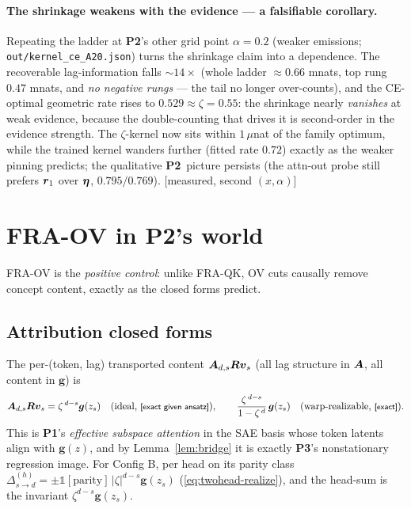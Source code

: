 \documentclass{article}
\newcommand{\gb}{\boldsymbol{g}}
\newcommand{\ind}{\mathbb{1}}
\newcommand{\htag}[1]{{\normalfont\sffamily\footnotesize[#1]}}
\newcommand{\Pone}{\textbf{P1}}
\newcommand{\Ptwo}{\textbf{P2}}
\newcommand{\Pthree}{\textbf{P3}}
\newcommand{\priorA}{\textsf{[prior-A]}}
\newcommand{\priorB}{\textsf{[prior-B]}}
\begin{document}
\paragraph{The shrinkage weakens with the evidence --- a falsifiable corollary.}
Repeating the ladder at \Ptwo's other grid point $\alpha=0.2$ (weaker emissions;
\texttt{out/kernel\_ce\_A20.json}) turns the shrinkage claim into a dependence. The
recoverable lag-information falls ${\sim}14\times$ (whole ladder ${\approx}0.66$ mnats,
top rung $0.47$ mnats, and \emph{no negative rungs} --- the tail no longer over-counts),
and the CE-optimal geometric rate rises to $0.529\approx\zeta=0.55$: the shrinkage nearly
\emph{vanishes} at weak evidence, because the double-counting that drives it is
second-order in the evidence strength. The $\zeta$-kernel now sits within $1\,\mu$nat of
the family optimum, while the trained kernel wanders further (fitted rate $0.72$) exactly
as the weaker pinning predicts; the qualitative \Ptwo\ picture persists (the attn-out
probe still prefers $\boldsymbol{r}_1$ over $\boldsymbol{\eta}$, $0.795/0.769$). \htag{measured, second
$(x,\alpha)$}

\section{FRA-OV in \Ptwo's world}\label{sec:ov}

FRA-OV is the \emph{positive control}: unlike FRA-QK, OV cuts causally remove
concept content, exactly as the closed forms predict.

\subsection{Attribution closed forms}\label{sec:ovclosed}

\begin{prop}[attribution closed form; imported \priorA/\priorB]\label{prop:attr}
The per-(token, lag) transported content $\boldsymbol{A}_{d,s}\boldsymbol{R}\boldsymbol{v}_s$ (all lag structure in
$\boldsymbol{A}$, all content in $\gb$) is
\begin{equation}\label{eq:ovclosed}
\Ab_{d,s}\Rb\vb_s=\zeta^{\,d-s}\gb(z_s)\quad\text{(ideal, \htag{exact given ansatz})},
\qquad
\frac{\zeta^{\,d-s}}{1-\zeta^{\,d}}\,\gb(z_s)\quad\text{(warp-realizable, \htag{exact})}.
\end{equation}
This is \Pone's \emph{effective subspace attention} in the SAE basis whose token
latents align with $\gb(z)$, and by Lemma~\ref{lem:bridge} it is exactly \Pthree's
nonstationary regression image. For Config B, per head on its parity class
$\Delta^{(h)}_{s\to d}=\pm\ind[\text{parity}]\,|\zeta|^{d-s}\gb(z_s)$
(\eqref{eq:twohead-realize}), and the head-sum is the invariant $\zeta^{d-s}\gb(z_s)$.
\end{prop}
\end{document}
